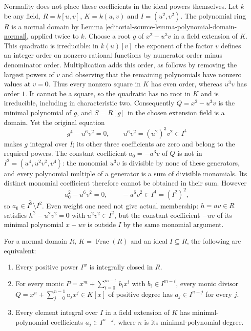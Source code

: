 \begin{example}
\label{editorial-source-example-weighted-coefficients-need-integral-closure}
Normality does not place these coefficients in the ideal
powers themselves. Let $k$ be any field,
$R=k[u,v]$, $K=k(u,v)$ and $I=(u^2,v^2)$.
The polynomial ring $R$ is a normal domain by
Lemma \ref{editorial-source-lemma-polynomial-domain-normal}, applied twice to $k$.
Choose a root $g$ of $x^2-u^3v$ in a field extension of $K$.
This quadratic is irreducible: in $k(u)[v]$ the exponent of
the factor $v$ defines an integer order on nonzero rational
functions by numerator order minus denominator order.
Multiplication adds this order, as follows by removing the
largest powers of $v$ and observing that the remaining
polynomials have nonzero values at $v=0$. Thus every nonzero
square in $K$ has even order, whereas $u^3v$ has order $1$.
It cannot be a square, so the quadratic has no root in $K$
and is irreducible, including in characteristic two.
Consequently $Q=x^2-u^3v$ is the minimal polynomial of $g$,
and $S=R[g]$ in the chosen extension field is a domain.
Yet the original equation
$$
g^4-u^6v^2=0,\qquad u^6v^2=(u^2)^3v^2\in I^4
$$
makes $g$ integral over $I$; its other three coefficients
are zero and belong to the required powers. The constant
coefficient $a_0=-u^3v$ of $Q$ is not in
$I^2=(u^4,u^2v^2,v^4)$: the monomial $u^3v$ is divisible
by none of these generators, and every polynomial multiple
of a generator is a sum of divisible monomials. Its distinct
monomial coefficient therefore cannot be obtained in their
sum. However
$$
a_0^2-u^6v^2=0,\qquad -u^6v^2\in I^4=(I^2)^2,
$$
so $a_0\in\overline{I^2}\setminus I^2$.
Even weight one need not give actual membership: $h=uv\in R$
satisfies $h^2-u^2v^2=0$ with $u^2v^2\in I^2$, but the
constant coefficient $-uv$ of its minimal polynomial $x-uv$
is outside $I$ by the same monomial argument.
\end{example}

\begin{lemma}
\label{editorial-source-lemma-integrally-closed-powers-monic-factors}
For a normal domain $R$, $K=\operatorname{Frac}(R)$ and an
ideal $I\subseteq R$, the following are equivalent:
\begin{enumerate}
\item Every positive power $I^w$ is integrally closed in $R$.
\item For every monic $P=x^m+\sum_{i=0}^{m-1}b_ix^i$ with
$b_i\in I^{m-i}$, every monic divisor
$Q=x^n+\sum_{j=0}^{n-1}a_jx^j\in K[x]$ of positive degree
has $a_j\in I^{n-j}$ for every $j$.
\item Every element integral over $I$ in a field extension of
$K$ has minimal-polynomial coefficients $a_j\in I^{n-j}$,
where $n$ is its minimal-polynomial degree.
\end{enumerate}
\end{lemma}

